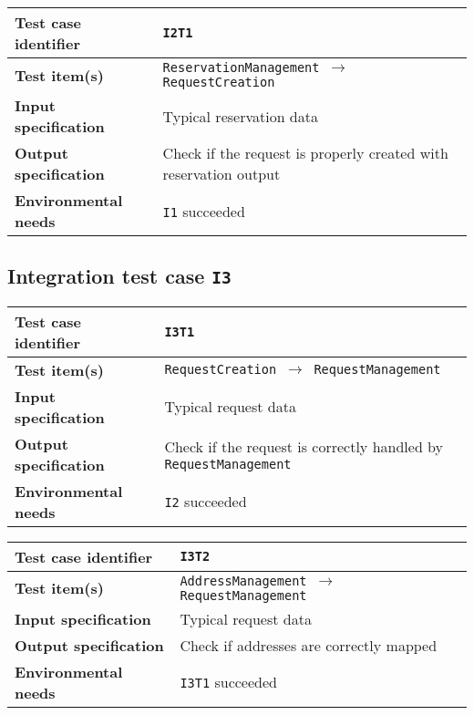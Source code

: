 \begin{table*}[!h]\centering\begin{tabularx}{.9\textwidth}{ >{\bfseries}l X }\toprule%
Test case identifier	&	\texttt{I2T1}	\\\midrule
Test item(s)		&	\texttt{ReservationManagement $\to$ RequestCreation}	\\\midrule
Input specification	&	Typical reservation data	\\\midrule
Output specification	&	Check if the request is properly created with reservation output	\\\midrule
Environmental needs	&	\texttt{I1} succeeded	\\
\bottomrule\end{tabularx}\end{table*}








\subsection*{Integration test case \normalfont\texttt{I3}}\label{subsec:t3}

\begin{table*}[!h]\centering\begin{tabularx}{.9\textwidth}{ >{\bfseries}l X }\toprule%
Test case identifier	&	\texttt{I3T1}	\\\midrule
Test item(s)		&	\texttt{RequestCreation $\to$ RequestManagement}	\\\midrule
Input specification	&	Typical request data	\\\midrule
Output specification	&	Check if the request is correctly handled by \texttt{RequestManagement}	\\\midrule
Environmental needs	&	\texttt{I2} succeeded	\\
\bottomrule\end{tabularx}\end{table*}



\clearpage



\begin{table*}[!h]\centering\begin{tabularx}{.9\textwidth}{ >{\bfseries}l X }\toprule%
Test case identifier	&	\texttt{I3T2}	\\\midrule
Test item(s)		&	\texttt{AddressManagement $\to$ RequestManagement}	\\\midrule
Input specification	&	Typical request data	\\\midrule
Output specification	&	Check if addresses are correctly mapped	\\\midrule
Environmental needs	&	\texttt{I3T1} succeeded	\\
\bottomrule\end{tabularx}\end{table*}












